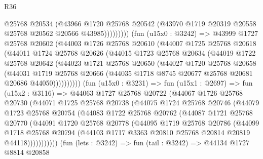 \begin{lexlean}{R36}
\begin{coremodule}
                      @25768
                      @20534
                      (@43966
                        @1720
                        @25768
                        @20542
                        (@43970 @1719 @20319 @20558 @25768 @20562 @20566 @43985)))))))))
        (fun (u15x0 : @3242) =>
        @43999
          @1727
          @25768
          @20602
          (@44003
            @1726
            @25768
            @20610
            (@44007
              @1725
              @25768
              @20618
              (@44011
                @1724
                @25768
                @20626
                (@44015
                  @1723
                  @25768
                  @20634
                  (@44019
                    @1722
                    @25768
                    @20642
                    (@44023
                      @1721
                      @25768
                      @20650
                      (@44027
                        @1720
                        @25768
                        @20658
                        (@44031
                          @1719
                          @25768
                          @20666
                          (@44035 @1718 @8745 @20677 @25768 @20681 @20686 @44050))))))))))
        (fun (u15x0 : @3231) =>
        fun (u15x1 : @2697) =>
        fun (u15x2 : @3116) =>
        @44063
          @1727
          @25768
          @20722
          (@44067
            @1726
            @25768
            @20730
            (@44071
              @1725
              @25768
              @20738
              (@44075
                @1724
                @25768
                @20746
                (@44079
                  @1723
                  @25768
                  @20754
                  (@44083
                    @1722
                    @25768
                    @20762
                    (@44087
                      @1721
                      @25768
                      @20770
                      (@44091
                        @1720
                        @25768
                        @20778
                        (@44095
                          @1719
                          @25768
                          @20786
                          (@44099
                            @1718
                            @25768
                            @20794
                            (@44103 @1717 @3363 @20810 @25768 @20814 @20819 @44118)))))))))))
        (fun (lets : @3242) =>
        fun (tail : @3242) =>
        @44134
          @1727
          @8814
          @20858

\end{coremodule}
\end{lexlean}
